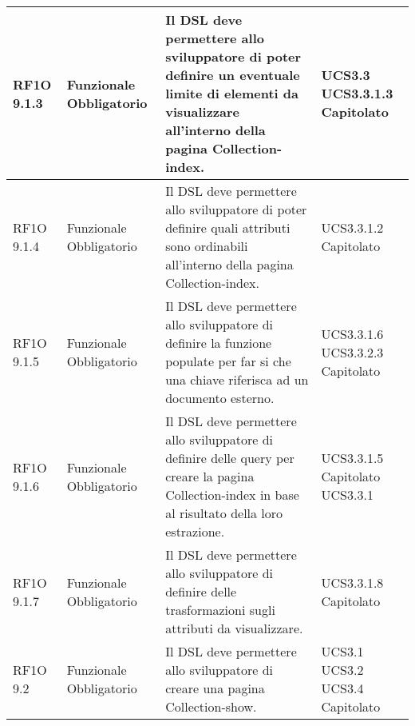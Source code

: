 \begin{center}
\begin{longtable}{ | l | p{2cm} | p{5cm} | p{1.7cm} |}
        RF1O 9.1.3  & Funzionale \newline  Obbligatorio  & Il DSL deve permettere allo sviluppatore di poter definire un eventuale limite di elementi da visualizzare all'interno della pagina Collection-index.
 &  UCS3.3 \newline  UCS3.3.1.3 \newline  Capitolato \newline  \\ \hline      
        RF1O 9.1.4  & Funzionale \newline  Obbligatorio  & Il DSL deve permettere allo sviluppatore di poter definire quali attributi sono ordinabili all'interno della pagina Collection-index.
 &  UCS3.3.1.2 \newline  Capitolato \newline  \\ \hline      
        RF1O 9.1.5 & Funzionale \newline  Obbligatorio  & Il DSL deve permettere allo sviluppatore di definire la funzione populate per far si che una chiave riferisca ad un documento esterno.
 &  UCS3.3.1.6 \newline  UCS3.3.2.3 \newline  Capitolato \newline  \\ \hline      
        RF1O 9.1.6 & Funzionale \newline  Obbligatorio  & Il DSL deve permettere allo sviluppatore di definire delle query per creare la pagina Collection-index in base al risultato della loro estrazione.
 &  UCS3.3.1.5 \newline  Capitolato \newline  UCS3.3.1 \newline  \\ \hline      
        RF1O 9.1.7 & Funzionale \newline  Obbligatorio  & Il DSL deve permettere allo sviluppatore di definire delle trasformazioni sugli attributi da visualizzare. &  UCS3.3.1.8 \newline  Capitolato \newline  \\ \hline      
        RF1O 9.2 & Funzionale \newline  Obbligatorio  & Il DSL deve permettere allo sviluppatore di creare una pagina Collection-show. &  UCS3.1 \newline  UCS3.2 \newline  UCS3.4 \newline  Capitolato \newline  \\ \hline      

\end{longtable}
\end{center}
